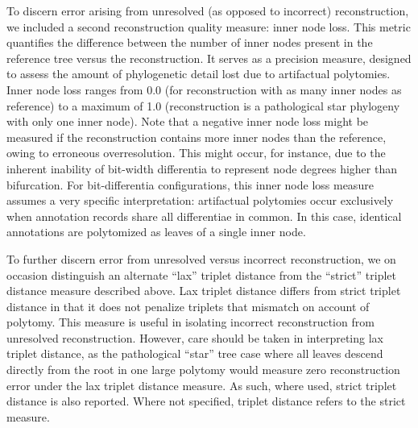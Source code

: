 To discern error arising from unresolved (as opposed to incorrect) reconstruction, we included a second reconstruction quality measure: inner node loss.
This metric quantifies the difference between the number of inner nodes present in the reference tree versus the reconstruction.
It serves as a precision measure, designed to assess the amount of phylogenetic detail lost due to artifactual polytomies.
Inner node loss ranges from 0.0 (for reconstruction with as many inner nodes as reference) to a maximum of 1.0 (reconstruction is a pathological star phylogeny with only one inner node).
Note that a negative inner node loss might be measured if the reconstruction contains more inner nodes than the reference, owing to erroneous overresolution.
This might occur, for instance, due to the inherent inability of bit-width differentia to represent node degrees higher than bifurcation.
For bit-differentia configurations, this inner node loss measure assumes a very specific interpretation: artifactual polytomies occur exclusively when annotation records share all differentiae in common.
In this case, identical annotations are polytomized as leaves of a single inner node.

To further discern error from unresolved versus incorrect reconstruction, we on occasion distinguish an alternate ``lax'' triplet distance from the ``strict'' triplet distance measure described above.
Lax triplet distance differs from strict triplet distance in that it does not penalize triplets that mismatch on account of polytomy.
This measure is useful in isolating incorrect reconstruction from unresolved reconstruction.
However, care should be taken in interpreting lax triplet distance, as the pathological ``star'' tree case where all leaves descend directly from the root in one large polytomy would measure zero reconstruction error under the lax triplet distance measure.
As such, where used, strict triplet distance is also reported.
Where not specified, triplet distance refers to the strict measure.

% 

